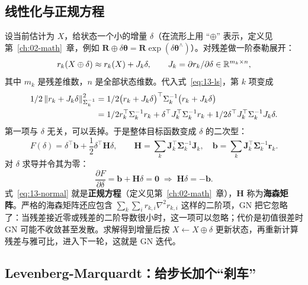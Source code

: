 \subsection{线性化与正规方程}

设当前估计为 $X$，给状态一个小的增量 $\delta$（在流形上用 ``$\oplus$'' 表示，定义见第~\ref{ch:02-math}~章，例如 $\bm{R}\oplus\delta\bm{\theta}=\bm{R}\exp(\delta\bm{\theta}^{\wedge})$）。对残差做一阶泰勒展开：
\begin{equation}
r_k(X\oplus\delta)\approx r_k(X)+J_k\delta,
\qquad
J_k=\partial r_k/\partial\delta\in\mathbb{R}^{m_k\times n},
\label{eq:13-taylor}
\end{equation}
其中 $m_k$ 是残差维数，$n$ 是全部状态维数。代入式~\eqref{eq:13-ls}，第 $k$ 项变成
\begin{align}
1/2\left\lVert r_k+J_k\delta \right\rVert_{\Sigma_k^{-1}}^{2}
&=1/2\big(r_k+J_k\delta\big)^{\top}\Sigma_k^{-1}\big(r_k+J_k\delta\big)\notag\\
&=1/2r_k^{\top}\Sigma_k^{-1}r_k
 +\delta^{\top}J_k^{\top}\Sigma_k^{-1}r_k
 +1/2\delta^{\top}J_k^{\top}\Sigma_k^{-1}J_k\delta .
\label{eq:13-quadratic}
\end{align}
第一项与 $\delta$ 无关，可以丢掉。于是整体目标函数变成 $\delta$ 的二次型：
\begin{equation}
F(\delta)=\delta^{\top}\bm{b}+\frac12\delta^{\top}\bm{H}\delta,
\qquad
\bm{H}=\sum_{k}\bm{J}_k^{\top}\bm{\Sigma}_k^{-1}\bm{J}_k,\quad
\bm{b}=\sum_{k}\bm{J}_k^{\top}\bm{\Sigma}_k^{-1}\bm{r}_k .
\label{eq:13-Hb}
\end{equation}
对 $\delta$ 求导并令其为零：
\begin{equation}
\frac{\partial F}{\partial\delta}=\bm{b}+\bm{H}\delta=\bm{0}
\;\Longrightarrow\;
\bm{H}\delta=-\bm{b}.
\label{eq:13-normal}
\end{equation}
式~\eqref{eq:13-normal} 就是\textbf{正规方程}（定义见第~\ref{ch:02-math}~章），$\bm{H}$ 称为\textbf{海森矩阵}。严格的海森矩阵还应包含 $\sum_k\sum_i r_{k,i}\nabla^2 r_{k,i}$ 这样的二阶项，GN 把它忽略了：当残差接近零或残差的二阶导数很小时，这一项可以忽略；代价是初值很差时 GN 可能不收敛甚至发散。求解得到增量后按 $X\leftarrow X\oplus\delta$ 更新状态，再重新计算残差与雅可比，进入下一轮，这就是 GN 迭代。

\subsection{Levenberg-Marquardt：给步长加个``刹车''}

